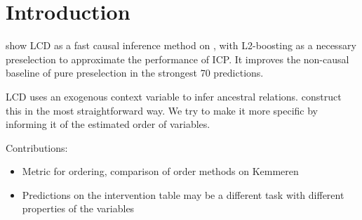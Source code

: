 \newpage
\section{Introduction}



\citet{versteeg2019boosting} show LCD as a fast causal inference method on \citet{kemmeren2014large}, with L2-boosting as a necessary preselection to approximate the performance of ICP. It improves the non-causal baseline of pure preselection in the strongest 70 predictions. 

LCD uses an exogenous context variable to infer ancestral relations. \citet{versteeg2019boosting} construct this in the most straightforward way. We try to make it more specific by informing it of the estimated order of variables. 

Contributions:
\begin{itemize}
    \item Metric for ordering, comparison of order methods on Kemmeren
    \item Predictions on the intervention table may be a different task with different properties of the variables
\end{itemize}